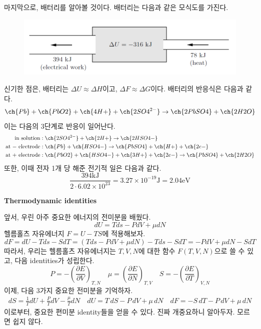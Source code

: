 \documentclass{article}
\begin{document}
마지막으로, 배터리를 알아볼 것이다. 배터리는 다음과 같은 모식도를 가진다.

\begin{figure}[h]
\centering
\includegraphics[width=0.6\linewidth]{images/fig1_6.png}
\end{figure}

\noindent
신기한 점은, 배터리는 $\Delta U \approx \Delta H$이고, $\Delta F \approx \Delta G$이다. 배터리의 반응식은 다음과 같다.
\begin{equation*}
    \ch{Pb} + \ch{Pb O2} + \ch{4 H+} + \ch{2 SO4 ^{2-}} \rightarrow \ch{2 Pb SO4} + \ch{2 H2 O}
\end{equation*}
이는 다음의 3단계로 반응이 일어난다.
\begin{align*}
    \text{in solution} &: \ch{2 SO4 ^{2-}} + \ch{2 H+} \rightarrow \ch{2 HSO4-}\\
    \text{at $-$ electrode} &: \ch{Pb}  + \ch{HSO4-} \rightarrow \ch{PbSO4} + \ch{H+} + \ch{2 e-}\\
    \text{at $+$ electrode} &: \ch{PbO2} + \ch{HSO4- } + \ch{3 H+}  + \ch{2 e-} \rightarrow \ch{Pb SO4} + \ch{2 H2O}
\end{align*}
또한, 이때 전자 1개 당 해준 전기적 일은 다음과 같다.
\begin{equation}
    \frac{394 \text{kJ}}{2 \cdot 6.02 \times 10^{23}} = 3.27 \times 10^{-19} \text{J} = 2.04 \text{eV}
\end{equation}

\noindent
\textbf{Thermodynamic identities}

앞서, 우린 아주 중요한 에너지의 전미분을 배웠다.
\begin{equation}
    \boxed{dU = Tds - PdV + \mu dN}
\end{equation}
헬름홀츠 자유에너지 $F = U - TS$에 적용해보자.
\begin{equation}
    dF = dU - Tds - SdT = (Tds - PdV + \mu dN) - Tds - SdT = \boxed{-PdV + \mu dN - SdT}
\end{equation}
따라서, 우리는 헬름홀츠 자유에너지는 $T, V, N$에 대한 함수 $F(T,V,N)$으로 쓸 수 있고, 다음 identities가 성립한다.
\begin{equation}
    \boxed{P = -\left( \frac{\partial E}{\partial V} \right)_{T, N}} \quad \boxed{\mu = \left( \frac{\partial E}{\partial N} \right)_{T, V}} \quad \boxed{S = -\left( \frac{\partial E}{\partial T} \right)_{V, N}}
\end{equation}
이제, 다음 3가지 중요한 전미분을 기억하자.
\begin{align}
    \boxed{dS = \frac{1}{T} dU + \frac{P}{T} dV - \frac{\mu}{T} dN} \quad \boxed{dU = T\,dS - P\,dV + \mu\,dN} \quad \boxed{dF = -S\,dT - P\,dV + \mu\,dN}
\end{align}
이로부터, 중요한 편미분 identity들을 얻을 수 있다. 진짜 개중요하니 알아두자. 모르면 쉽지 않다.
\end{document}
